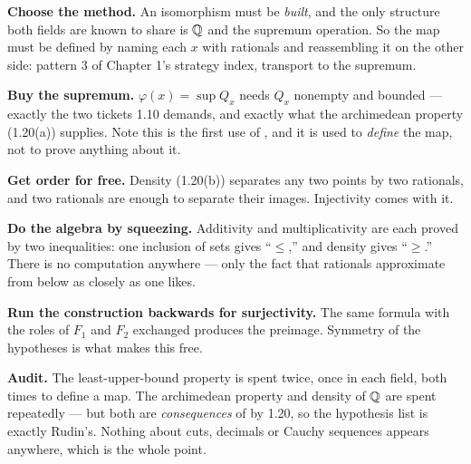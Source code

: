 \begin{proofwalk}
  \item \textbf{Choose the method.} An isomorphism must be \emph{built}, and
        the only structure both fields are known to share is $\mathbb{Q}$ and the
        supremum operation. So the map must be defined by naming each $x$
        with rationals and reassembling it on the other side: pattern 3 of
        Chapter 1's strategy index, transport to the supremum.
  \item \textbf{Buy the supremum.} $\varphi(x) = \sup Q_x$ needs $Q_x$
        nonempty and bounded --- exactly the two tickets 1.10 demands, and
        exactly what the archimedean property (1.20(a)) supplies. Note this
        is the first use of \lub{}, and it is used to \emph{define} the map,
        not to prove anything about it.
  \item \textbf{Get order for free.} Density (1.20(b)) separates any two
        points by two rationals, and two rationals are enough to separate
        their images. Injectivity comes with it.
  \item \textbf{Do the algebra by squeezing.} Additivity and multiplicativity
        are each proved by two inequalities: one inclusion of sets gives
        ``$\le$,'' and density gives ``$\ge$.'' There is no computation
        anywhere --- only the fact that rationals approximate from below as
        closely as one likes.
  \item \textbf{Run the construction backwards for surjectivity.} The same
        formula with the roles of $F_1$ and $F_2$ exchanged produces the
        preimage. Symmetry of the hypotheses is what makes this free.
  \item \textbf{Audit.} The least-upper-bound property is spent twice, once
        in each field, both times to define a map. The archimedean property
        and density of $\mathbb{Q}$ are spent repeatedly --- but both are
        \emph{consequences} of \lub{} by 1.20, so the hypothesis list is
        exactly Rudin's. Nothing about cuts, decimals or Cauchy sequences
        appears anywhere, which is the whole point.
\end{proofwalk}


